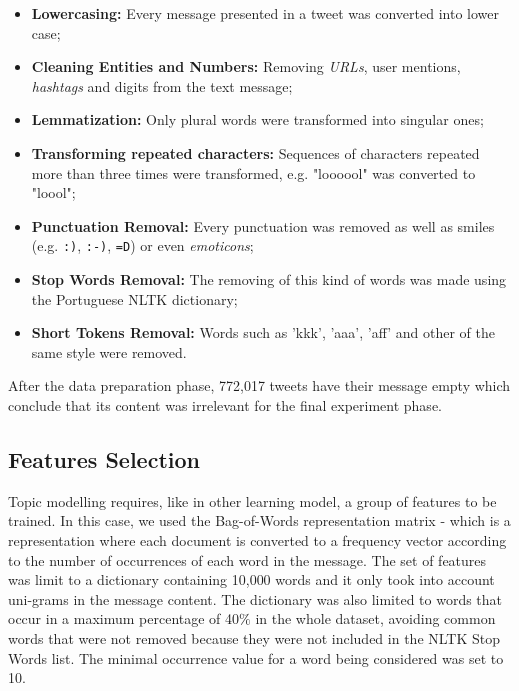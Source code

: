 \begin{itemize}
	\item \textbf{Lowercasing:} Every message presented in a tweet was converted into lower case;
	\item \textbf{Cleaning Entities and Numbers:} Removing \textit{URLs}, user mentions, \textit{hashtags} and digits from the text message;
	\item \textbf{Lemmatization:} Only plural words were transformed into singular ones;
	\item \textbf{Transforming repeated characters:} Sequences of characters repeated more than three times were transformed, e.g. "loooool" was converted to "loool";
	\item \textbf{Punctuation Removal:} Every punctuation was removed as well as smiles (e.g. \texttt{:)}, \texttt{:-)}, \texttt{=D}) or even \emph{emoticons};
	\item \textbf{Stop Words Removal:} The removing of this kind of words was made using the Portuguese NLTK dictionary;
	\item \textbf{Short Tokens Removal:} Words such as 'kkk', 'aaa', 'aff' and other of the same style were removed.
\end{itemize}

After the data preparation phase, 772,017 tweets have their message empty which conclude that its content was irrelevant for the final experiment phase.

\subsection{Features Selection}
Topic modelling requires, like in other learning model, a group of features to be trained. In this case, we used the Bag-of-Words representation matrix - which is a representation where each document is converted to a frequency vector according to the number of occurrences of each word in the message. The set of features was limit to a dictionary containing 10,000 words and it only took into account uni-grams in the message content. The dictionary was also limited to words that occur in a maximum percentage of 40$\%$ in the whole dataset, avoiding common words that were not removed because they were not included in the NLTK Stop Words list. The minimal occurrence value for a word being considered was set to 10.

